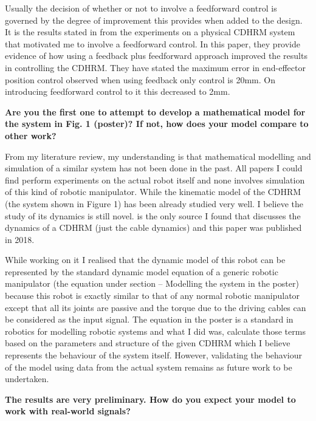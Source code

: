 \documentclass[a4paper,12pt]{article}
\begin{document}
Usually the decision of whether or not to involve a feedforward control is governed by the degree of improvement this provides when added to the design. It is the results stated in \cite{RN30} from the experiments on a physical CDHRM system that motivated me to involve a feedforward control. In this paper, they provide evidence of how using a feedback plus feedforward approach improved the results in controlling the CDHRM. They have stated the maximum error in end-effector position control observed when using feedback only control is 20mm. On introducing feedforward control to it this decreased to 2mm.

\hspace{10pt}

\textbf{Are you the first one to attempt to develop a mathematical model for the system in Fig. 1 (poster)? If not, how does your model compare to other work?}

From my literature review, my understanding is that mathematical modelling and simulation of a similar system has not been done in the past. All papers I could find perform experiments on the actual robot itself and none involves simulation of this kind of robotic manipulator. While the kinematic model of the CDHRM (the system shown in Figure 1) has been already studied very well. I believe the study of its dynamics is still novel. \cite{RN30} is the only source I found that discusses the dynamics of a CDHRM (just the cable dynamics) and this paper was published in 2018.

While working on it I realised that the dynamic model of this robot can be represented by the standard dynamic model equation of a generic robotic manipulator (the equation under section – Modelling the system in the poster) because this robot is exactly similar to that of any normal robotic manipulator except that all its joints are passive and the torque due to the driving cables can be considered as the input signal. The equation in the poster is a standard in robotics for modelling robotic systems and what I did was, calculate those terms based on the parameters and structure of the given CDHRM which I believe represents the behaviour of the system itself. However, validating the behaviour of the model using data from the actual system remains as future work to be undertaken.

\hspace{10pt}

\textbf{The results are very preliminary. How do you expect your model to work with real-world signals?}
\end{document}
